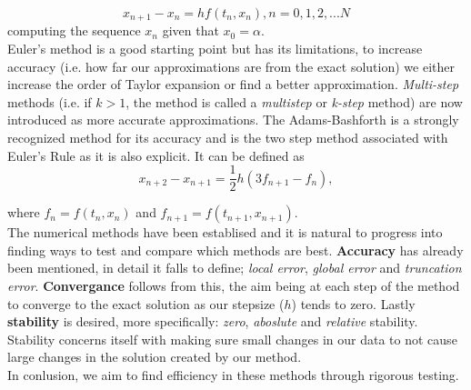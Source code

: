 \documentclass[11pt]{article}
\begin{document}
\begin{equation}
x_{n+1}-x_{n} = hf(t_{n},x_{n}), n=0,1,2,...N
\end{equation}
computing the sequence {$x_{n}$} given that $x_{0}=\alpha$. \citep{Griffiths}\\
\hspace*{1em}    Euler's method is a good starting point but has its limitations, to increase accuracy (i.e. how far our approximations are from the exact solution) we either increase the order of Taylor expansion or find a better approximation. \textit{Multi-step} methods (i.e. if $k>1$, the method is called a \textit{multistep} or \textit{k-step} method)
are now introduced as more accurate approximations. The Adams-Bashforth is a strongly recognized method for its accuracy and is the two step method associated with Euler's Rule as it is also explicit. It can be defined as
\begin{equation}
x_{n+2}-x_{n+1}=\frac{1}{2}h(3f_{n+1}-f_{n}),
\end{equation} 

where $f_{n}=f(t_{n},x_{n})$ and $f_{n+1}=f(t_{n+1},x_{n+1})$. \citep{Griffiths}\\
\hspace*{1em}   The numerical methods have been establised and it is natural to progress into finding ways to test and compare which methods are best. \textbf{Accuracy} has already been mentioned, in detail it falls to define; \textit{local error}, \textit{global error} and \textit{truncation error}. \textbf{Convergance} follows from this, the aim being at each step of the method to converge to the exact solution as our stepsize ($h$) tends to zero. Lastly \textbf{stability} is desired, more specifically: \textit{zero}, \textit{aboslute} and \textit{relative} stability. Stability concerns itself with making sure small changes in our data to not cause large changes in the solution created by our method.\\
\hspace*{1em}    In conlusion, we aim to find efficiency in these methods through rigorous testing.
\end{document}
